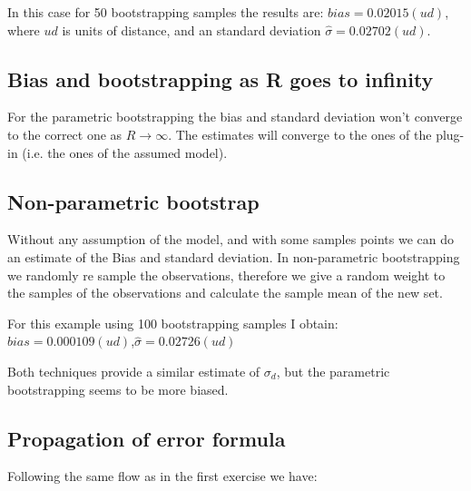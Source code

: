 \documentclass[10pt]{article}
\begin{document}
  \begin{algorithmic}
  \ENDFOR
  \end{algorithmic}

In this case for 50 bootstrapping samples the results are: $bias = 0.02015(ud)$, where $ud$ is units of distance,
and an standard deviation $\hat{\sigma} = 0.02702(ud)$.


\subsection{Bias and bootstrapping as R goes to infinity}
For the parametric bootstrapping the bias and standard deviation won't converge to the correct
one as $R\rightarrow \infty$. The estimates will converge to the ones of the plug-in (i.e. the ones 
of the assumed model).


\subsection{Non-parametric bootstrap}
Without any assumption of the model, and with some samples points we can
do an estimate of the Bias and standard deviation.
In non-parametric bootstrapping we randomly re sample the observations, therefore
we give a random weight to the samples of the observations and calculate
the sample mean of the new set.

  \begin{algorithmic}
  \ENDFOR
  \end{algorithmic}

For this example using 100 bootstrapping samples I obtain: $bias = 0.000109(ud)$,$\hat{\sigma} = 0.02726(ud)$

Both techniques provide a similar estimate of $\sigma_d$, but the parametric bootstrapping seems to be more
biased. 

\subsection{Propagation of error formula}


Following the same flow as in the first exercise we have:
\end{document}
